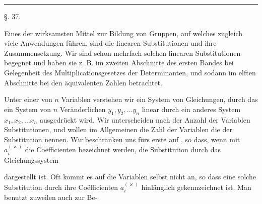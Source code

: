 
\begin{center}

\end{center}

\begin{center}
\rule{3cm}{0.4pt}
\end{center}

\begin{center}
§. 37.

\end{center}

Eines der wirksamsten Mittel zur Bildung von Gruppen, auf welches zugleich viele Anwendungen führen, sind die linearen Substitutionen und ihre Zusammensetzung. Wir sind schon mehrfach solchen linearen Substitutionen begegnet und haben sie z. B. im zweiten Abschnitte des ersten Bandes bei Gelegenheit des Multiplicationsgesetzes der Determinanten, und sodann im elften Abschnitte bei den äquivalenten Zahlen betrachtet.

Unter einer  von $n$ Variablen verstehen wir ein System von Gleichungen, durch das ein System von $n$ Veränderlichen $y_1, y_2, \dots y_n$ linear durch ein anderes System $x_1, x_2, \dots x_n$ ausgedrückt wird. Wir unterscheiden nach der Anzahl der Variablen  Substitutionen, und wollen im Allgemeinen die Zahl der Variablen die  der Substitution nennen. Wir beschränken uns fürs erste auf , so dass, wenn mit $a_i^{(\varkappa)}$ die Coëfficienten bezeichnet werden, die Substitution durch das Gleichungssystem


dargestellt ist. Oft kommt es auf die Variablen selbst nicht an, so dass eine solche Substitution durch ihre Coëfficienten $a_i^{(\varkappa)}$ hinlänglich gekennzeichnet ist. Man benutzt zuweilen auch zur Be-

